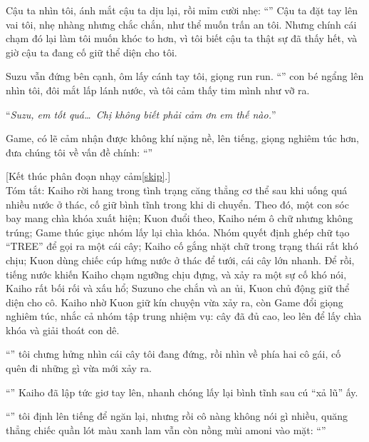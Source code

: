 \documentclass[../main.tex]{subfiles}
\begin{document}
Cậu ta nhìn tôi, ánh mắt cậu ta dịu lại, rồi mỉm cười nhẹ: ``'' Cậu ta đặt tay lên vai tôi, nhẹ nhàng nhưng chắc chắn, như thể muốn trấn an tôi. Nhưng chính cái chạm đó lại làm tôi muốn khóc to hơn, vì tôi biết cậu ta thật sự đã thấy hết, và giờ cậu ta đang cố giữ thể diện cho tôi.

Suzu vẫn đứng bên cạnh, ôm lấy cánh tay tôi, giọng run run. ``'' con bé ngẩng lên nhìn tôi, đôi mắt lấp lánh nước, và tôi cảm thấy tim mình như vỡ ra.

``\textit{Suzu, em tốt quá\dots\ Chị không biết phải cảm ơn em thế nào.}''

Game, có lẽ cảm nhận được không khí nặng nề, lên tiếng, giọng nghiêm túc hơn, đưa chúng tôi về vấn đề chính: ``''


\begin{center}
  [Kết thúc phân đoạn nhạy cảm\ref{skip}.]\\Tóm tắt: Kaiho rời hang trong tình trạng căng thẳng cơ thể sau khi uống quá nhiều nước ở thác, cố giữ bình tĩnh trong khi di chuyển. Theo đó, một con sóc bay mang chìa khóa xuất hiện; Kuon đuổi theo, Kaiho ném ô chữ nhưng không trúng; Game thúc giục nhóm lấy lại chìa khóa. Nhóm quyết định ghép chữ tạo ``TREE'' để gọi ra một cái cây; Kaiho cố gắng nhặt chữ trong trạng thái rất khó chịu; Kuon dùng chiếc cúp hứng nước ở thác để tưới, cái cây lớn nhanh. Để rồi, tiếng nước khiến Kaiho chạm ngưỡng chịu đựng, và xảy ra một sự cố khó nói, Kaiho rất bối rối và xấu hổ; Suzuno che chắn và an ủi, Kuon chủ động giữ thể diện cho cô. Kaiho nhờ Kuon giữ kín chuyện vừa xảy ra, còn Game đổi giọng nghiêm túc, nhắc cả nhóm tập trung nhiệm vụ: cây đã đủ cao, leo lên để lấy chìa khóa và giải thoát con dê.
\end{center}

``'' tôi chưng hửng nhìn cái cây tôi đang đứng, rồi nhìn về phía hai cô gái, cố quên đi những gì vừa mới xảy ra.

``'' Kaiho đã lập tức giơ tay lên, nhanh chóng lấy lại bình tĩnh sau cú ``xả lũ'' ấy.

``'' tôi định lên tiếng để ngăn lại, nhưng rồi cô nàng không nói gì nhiều, quăng thẳng chiếc quần lót màu xanh lam vẫn còn nồng mùi amoni vào mặt: ``''
\end{document}
